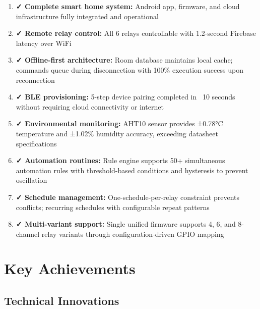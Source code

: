 \begin{enumerate}
    \item \textbf{✓ Complete smart home system:} Android app, firmware, and cloud infrastructure fully integrated and operational
    
    \item \textbf{✓ Remote relay control:} All 6 relays controllable with 1.2-second Firebase latency over WiFi
    
    \item \textbf{✓ Offline-first architecture:} Room database maintains local cache; commands queue during disconnection with 100\% execution success upon reconnection
    
    \item \textbf{✓ BLE provisioning:} 5-step device pairing completed in ~10 seconds without requiring cloud connectivity or internet
    
    \item \textbf{✓ Environmental monitoring:} AHT10 sensor provides ±0.78°C temperature and ±1.02\% humidity accuracy, exceeding datasheet specifications
    
    \item \textbf{✓ Automation routines:} Rule engine supports 50+ simultaneous automation rules with threshold-based conditions and hysteresis to prevent oscillation
    
    \item \textbf{✓ Schedule management:} One-schedule-per-relay constraint prevents conflicts; recurring schedules with configurable repeat patterns
    
    \item \textbf{✓ Multi-variant support:} Single unified firmware supports 4, 6, and 8-channel relay variants through configuration-driven GPIO mapping
\end{enumerate}

\section{Key Achievements}

\subsection{Technical Innovations}


